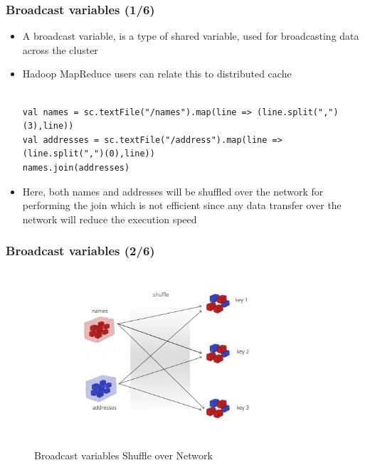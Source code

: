 \begin{frame}[fragile]
	\frametitle{Broadcast variables (1/6)}
	\begin{itemize}[<+->]
		\item A broadcast variable, is a type of shared variable, used for broadcasting data across the cluster
		\item Hadoop MapReduce users can relate this to distributed cache
			\begin{lstlisting}[style=myScalastyle, caption=Broadcast variables Example]

val names = sc.textFile("/names").map(line => (line.split(",")(3),line))
val addresses = sc.textFile("/address").map(line => (line.split(",")(0),line))
names.join(addresses)
\end{lstlisting}
		\item Here, both names and addresses will be shuffled over the network for performing the join which is not efficient since any data transfer over the network will reduce the execution speed
	\end{itemize}
\end{frame}

\begin{frame}
	\frametitle{Broadcast variables (2/6)}
		\begin{figure}
			\caption{Broadcast variables Shuffle over Network}  		  	
			\includegraphics[width=\textwidth,height=6.5cm]{Graphics/Broadcastvariables.png}
		\end{figure}

\end{frame}



